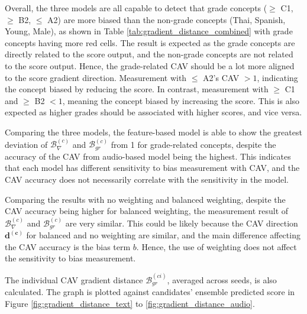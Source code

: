 Overall, the three models are all capable to detect that grade concepts ($\geq$ C1, $\geq$ B2, $\leq$ A2) are more biased than the non-grade concepts (Thai, Spanish, Young, Male), as shown in Table \ref{tab:gradient_distance_combined} with grade concepts having more red cells. The result is expected as the grade concepts are directly related to the score output, and the non-grade concepts are not related to the score output. Hence, the grade-related CAV should be a lot more aligned to the score gradient direction. Measurement with $\leq$ A2's CAV $> 1$, indicating the concept biased by reducing the score. In contrast, measurement with $\geq$ C1 and $\geq$ B2 $< 1$, meaning the concept biased by increasing the score. This is also expected as higher grades should be associated with higher scores, and vice versa.

Comparing the three models, the feature-based model is able to show the greatest deviation of $\mathcal{B}^{(c)}_{\nabla}$ and $\mathcal{B}^{(c)}_{gr}$ from 1 for grade-related concepts, despite the accuracy of the CAV from audio-based model being the highest. This indicates that each model has different sensitivity to bias measurement with CAV, and the CAV accuracy does not necessarily correlate with the sensitivity in the model.

Comparing the results with no weighting and balanced weighting, despite the CAV accuracy being higher for balanced weighting, the measurement result of $\mathcal{B}^{(c)}_{\nabla}$ and $\mathcal{B}^{(c)}_{gr}$ are very similar. This could be likely because the CAV direction $\boldsymbol{d^{(c)}}$ for balanced and no weighting are similar, and the main difference affecting the CAV accuracy is the bias term $b$. Hence, the use of weighting does not affect the sensitivity to bias measurement.

The individual CAV gradient distance $\mathcal{B}^{(ci)}_{gr}$, averaged across seeds, is also calculated. The graph is plotted against candidates’ ensemble predicted score in Figure \ref{fig:gradient_distance_text} to \ref{fig:gradient_distance_audio}.

